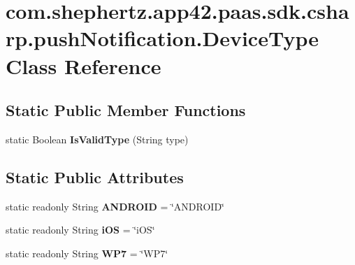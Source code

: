 \hypertarget{classcom_1_1shephertz_1_1app42_1_1paas_1_1sdk_1_1csharp_1_1push_notification_1_1_device_type}{\section{com.\+shephertz.\+app42.\+paas.\+sdk.\+csharp.\+push\+Notification.\+Device\+Type Class Reference}
\label{classcom_1_1shephertz_1_1app42_1_1paas_1_1sdk_1_1csharp_1_1push_notification_1_1_device_type}
}
\subsection*{Static Public Member Functions}
\begin{DoxyCompactItemize}
\item 
\hypertarget{classcom_1_1shephertz_1_1app42_1_1paas_1_1sdk_1_1csharp_1_1push_notification_1_1_device_type_ab7b80d86a5bd885c23bd78ece214360c}{static Boolean {\bfseries Is\+Valid\+Type} (String type)}\label{classcom_1_1shephertz_1_1app42_1_1paas_1_1sdk_1_1csharp_1_1push_notification_1_1_device_type_ab7b80d86a5bd885c23bd78ece214360c}

\end{DoxyCompactItemize}
\subsection*{Static Public Attributes}
\begin{DoxyCompactItemize}
\item 
\hypertarget{classcom_1_1shephertz_1_1app42_1_1paas_1_1sdk_1_1csharp_1_1push_notification_1_1_device_type_a8ddc7aaec2d32d0830cec35867e33124}{static readonly String {\bfseries A\+N\+D\+R\+O\+I\+D} = \char`\"{}A\+N\+D\+R\+O\+I\+D\char`\"{}}\label{classcom_1_1shephertz_1_1app42_1_1paas_1_1sdk_1_1csharp_1_1push_notification_1_1_device_type_a8ddc7aaec2d32d0830cec35867e33124}

\item 
\hypertarget{classcom_1_1shephertz_1_1app42_1_1paas_1_1sdk_1_1csharp_1_1push_notification_1_1_device_type_ac8ed981f2a6c0646ef358158e8061b61}{static readonly String {\bfseries i\+O\+S} = \char`\"{}i\+O\+S\char`\"{}}\label{classcom_1_1shephertz_1_1app42_1_1paas_1_1sdk_1_1csharp_1_1push_notification_1_1_device_type_ac8ed981f2a6c0646ef358158e8061b61}

\item 
\hypertarget{classcom_1_1shephertz_1_1app42_1_1paas_1_1sdk_1_1csharp_1_1push_notification_1_1_device_type_a076d1c4987340289ec7113e2b144fa3d}{static readonly String {\bfseries W\+P7} = \char`\"{}W\+P7\char`\"{}}\label{classcom_1_1shephertz_1_1app42_1_1paas_1_1sdk_1_1csharp_1_1push_notification_1_1_device_type_a076d1c4987340289ec7113e2b144fa3d}

\end{DoxyCompactItemize}
